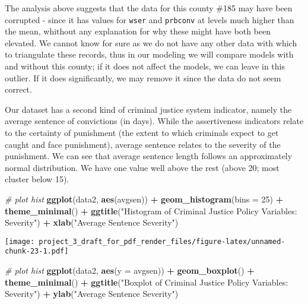 \documentclass[]{article}
\newenvironment{Shaded}{\begin{snugshade}}{\end{snugshade}}
\newcommand{\CommentTok}[1]{\textcolor[rgb]{0.56,0.35,0.01}{\textit{#1}}}
\newcommand{\DataTypeTok}[1]{\textcolor[rgb]{0.13,0.29,0.53}{#1}}
\newcommand{\DecValTok}[1]{\textcolor[rgb]{0.00,0.00,0.81}{#1}}
\newcommand{\KeywordTok}[1]{\textcolor[rgb]{0.13,0.29,0.53}{\textbf{#1}}}
\newcommand{\NormalTok}[1]{#1}
\newcommand{\OperatorTok}[1]{\textcolor[rgb]{0.81,0.36,0.00}{\textbf{#1}}}
\newcommand{\StringTok}[1]{\textcolor[rgb]{0.31,0.60,0.02}{#1}}
\begin{document}
The analysis above suggests that the data for this county \#185 may have
been corrupted - since it has values for \texttt{wser} and
\texttt{prbconv} at levels much higher than the mean, whithout any
explanation for why these might have both been elevated. We cannot know
for sure as we do not have any other data with which to triangulate
these records, thus in our modeling we will compare models with and
without this county; if it does not affect the models, we can leave in
this outlier. If it does significantly, we may remove it since the data
do not seem correct.

Our dataset has a second kind of criminal justice system indicator,
namely the average sentence of convictions (in days). While the
assertiveness indicators relate to the certainty of punishment (the
extent to which criminals expect to get caught and face punishment),
average sentence relates to the severity of the punishment. We can see
that average sentence length follows an approximately normal
distribution. We have one value well above the rest (above 20; most
cluster below 15).

\begin{Shaded}
\begin{Highlighting}[]
\CommentTok{# plot hist}
\KeywordTok{ggplot}\NormalTok{(data2, }\KeywordTok{aes}\NormalTok{(avgsen)) }\OperatorTok{+}
\StringTok{  }\KeywordTok{geom_histogram}\NormalTok{(}\DataTypeTok{bins =} \DecValTok{25}\NormalTok{) }\OperatorTok{+}
\StringTok{  }\KeywordTok{theme_minimal}\NormalTok{() }\OperatorTok{+}
\StringTok{  }\KeywordTok{ggtitle}\NormalTok{(}\StringTok{"Histogram of Criminal Justice Policy Variables: Severity"}\NormalTok{) }\OperatorTok{+}
\StringTok{  }\KeywordTok{xlab}\NormalTok{(}\StringTok{"Average Sentence Severity"}\NormalTok{)}
\end{Highlighting}
\end{Shaded}

\texttt{[image: project\_3\_draft\_for\_pdf\_render\_files/figure-latex/unnamed-chunk-23-1.pdf]}

\begin{Shaded}
\begin{Highlighting}[]
\CommentTok{# plot hist}
\KeywordTok{ggplot}\NormalTok{(data2, }\KeywordTok{aes}\NormalTok{(}\DataTypeTok{y =}\NormalTok{ avgsen)) }\OperatorTok{+}
\StringTok{  }\KeywordTok{geom_boxplot}\NormalTok{() }\OperatorTok{+}
\StringTok{  }\KeywordTok{theme_minimal}\NormalTok{() }\OperatorTok{+}
\StringTok{  }\KeywordTok{ggtitle}\NormalTok{(}\StringTok{"Boxplot of Criminal Justice Policy Variables: Severity"}\NormalTok{) }\OperatorTok{+}
\StringTok{  }\KeywordTok{ylab}\NormalTok{(}\StringTok{"Average Sentence Severity"}\NormalTok{)}
\end{Highlighting}
\end{Shaded}
\end{document}
